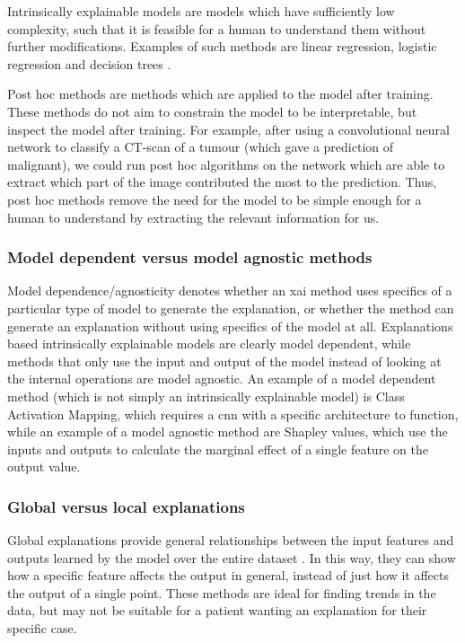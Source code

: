 \documentclass[UKenglish]{uiomasterthesis} %
\theoremstyle{definition}
\begin{document}
Intrinsically explainable models are models which have sufficiently low complexity, such that it is feasible for a human to understand them without further modifications. Examples of such methods are linear regression, logistic regression and decision trees \cite{molnar}. 

Post hoc methods are methods which are applied to the model after training. These methods do not aim to constrain the model to be interpretable, but inspect the model after training. For example, after using a convolutional neural network to classify a CT-scan of a tumour (which gave a prediction of malignant), we could run post hoc algorithms on the network which are able to extract which part of the image contributed the most to the prediction. Thus, post hoc methods remove the need for the model to be simple enough for a human to understand by extracting the relevant information for us.

\subsubsection{Model dependent versus model agnostic methods}

Model dependence/agnosticity denotes whether an \ac{xai} method uses specifics of a particular type of model to generate the explanation, or whether the method can generate an explanation without using specifics of the model at all. Explanations based intrinsically explainable models are clearly model dependent, while methods that only use the input and output of the model instead of looking at the internal operations are model agnostic. An example of a model dependent method (which is not simply an intrinsically explainable model) is Class Activation Mapping, which requires a \ac{cnn} with a specific architecture to function, while an example of a model agnostic method are Shapley values, which use the inputs and outputs to calculate the marginal effect of a single feature on the output value.

\subsubsection{Global versus local explanations}

Global explanations provide general relationships between the input features and outputs learned by the model over the entire dataset \cite{xaioverview}. In this way, they can show how a specific feature affects the output in general, instead of just how it affects the output of a single point. These methods are ideal for finding trends in the data, but may not be suitable for a patient wanting an explanation for their specific case.
\end{document}
